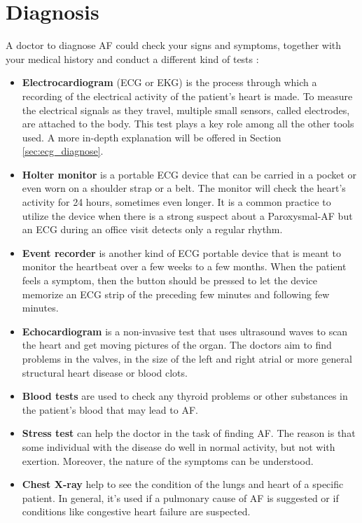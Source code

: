 \section{Diagnosis}
\label{af_diagnosis}
A doctor to diagnose AF could check your signs and symptoms, together with your medical history and conduct a different kind of tests \cite{mayo_clinic_2019}:
\begin{itemize}
\item \textbf{Electrocardiogram} (ECG or EKG) is the process through which a recording of the electrical activity of the patient's heart is made. To measure the electrical signals as they travel, multiple small sensors, called electrodes, are attached to the body. This test plays a key role among all the other tools used. A more in-depth explanation will be offered in Section \ref{sec:ecg_diagnose}.
\item \textbf{Holter monitor} is a portable ECG device that can be carried in a pocket or even worn on a shoulder strap or a belt. The monitor will check the heart's activity for 24 hours, sometimes even longer. It is a common practice to utilize the device when there is a strong suspect about a Paroxysmal-AF but an ECG during an office visit detects only a regular rhythm.
\item \textbf{Event recorder} is another kind of ECG portable device that is meant to monitor the heartbeat over a few weeks to a few months. When the patient feels a symptom, then the button should be pressed to let the device memorize an ECG strip of the preceding few minutes and following few minutes.
\item \textbf{Echocardiogram} is a non-invasive test that uses ultrasound waves to scan the heart and get moving pictures of the organ. The doctors aim to find problems in the valves, in the size of the left and right atrial or more general structural heart disease or blood clots.
\item \textbf{Blood tests} are used to check any thyroid problems or other substances in the patient's blood that may lead to AF.
\item \textbf{Stress test} can help the doctor in the task of finding AF. The reason is that some individual with the disease do well in normal activity, but not with exertion. Moreover, the nature of the symptoms can be understood.
\item \textbf{Chest X-ray} help to see the condition of the lungs and heart of a specific patient. In general, it's used if a pulmonary cause of AF is suggested or if conditions like congestive heart failure are suspected.
\end{itemize}

